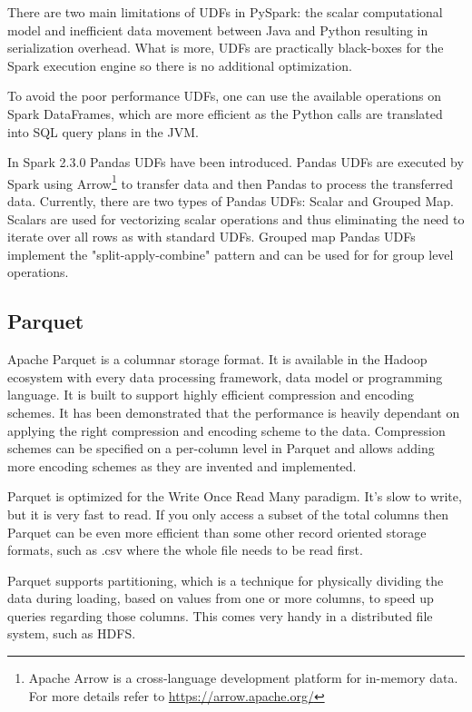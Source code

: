 There are two main limitations of UDFs in PySpark: the scalar computational model and inefficient data movement between Java and Python resulting in serialization overhead. What is more, UDFs are practically black-boxes for the Spark execution engine so there is no additional optimization. 

To avoid the poor performance UDFs, one can use the available operations on Spark DataFrames, which are more efficient as the Python calls are translated into SQL query plans in the JVM. 

In Spark 2.3.0 Pandas UDFs have been introduced. Pandas UDFs are executed by Spark using Arrow\footnote{Apache Arrow is a cross-language development platform for in-memory data. For more details refer to \url{https://arrow.apache.org/}} to transfer data and then Pandas to process the transferred data. Currently, there are two types of Pandas UDFs: Scalar and Grouped Map. Scalars are used for vectorizing scalar operations and thus eliminating the need to iterate over all rows as with standard UDFs. Grouped map Pandas UDFs implement the "split-apply-combine" pattern and can be used for for group level operations.\cite{spark-sql}

\subsection{Parquet}
Apache Parquet is a columnar storage format. It is available in the Hadoop ecosystem with every data processing framework, data model or programming language. It is built to support highly efficient compression and encoding schemes. It has been demonstrated that the performance is heavily dependant on applying the right compression and encoding scheme to the data. Compression schemes can be specified on a per-column level in Parquet and allows adding more encoding schemes as they are invented and implemented.
\cite{parquet}

Parquet is optimized for the Write Once Read Many paradigm. It's slow to write, but it is very fast to read. If you only access a subset of the total columns then Parquet can be even more efficient than some other record oriented storage formats, such as .csv where the whole file needs to be read first. 

Parquet supports partitioning, which is a technique for physically dividing the data during loading, based on values from one or more columns, to speed up queries regarding those columns. This comes very handy in a distributed file system, such as HDFS.


